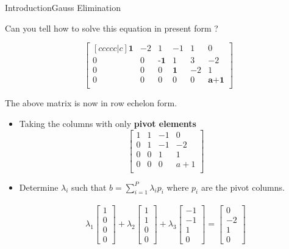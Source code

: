 \documentclass[10pt]{beamer}
\begin{document}
\begin{frame}[shrink=20]{Introduction}{Gauss Elimination}

\vspace{0.25in}

Can you tell how to solve this equation in present form ?

\begin{equation}
\begin{bmatrix}[ccccc|c] \textbf{1} & -2 & 1 & -1 & 1 &  0 \\  0 & 0 & \textbf{-1} & 1 & 3 &  -2\\ 0 & 0 & 0 & \textbf{1} & -2 &  1\\ 0 & 0 & 0 & 0 & 0 &  \textbf{a+1}\\ \end{bmatrix}
\end{equation}

The above matrix is now in row echelon form. 

\begin{itemize}

\pause
\item Taking the columns with only \textbf{pivot elements}
\begin{equation}
\begin{bmatrix}  1  & 1 & -1 &  0 \\  0 & 1  & -1 &  -2\\ 0 & 0  & 1 &  1\\ 0 & 0  & 0 &  a+1\\ \end{bmatrix}
\end{equation}

\pause
\item Determine $\lambda_{i}$ such that $b=\sum_{i=1}^{P}\lambda_{i}p_{i}$ where $p_{i}$ are the pivot columns.

\begin{align}
\lambda_{1}\begin{bmatrix}1\\0\\0\\0\end{bmatrix}+\lambda_{2}\begin{bmatrix}1\\1\\0\\0\end{bmatrix}+\lambda_{3}\begin{bmatrix}-1\\-1\\1\\0\end{bmatrix} = \begin{bmatrix}0\\-2\\1\\0\end{bmatrix}
\end{align}

\end{itemize}

\end{frame}
\end{document}
